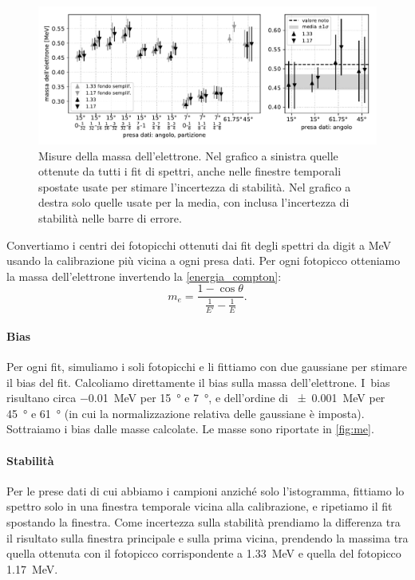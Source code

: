 \begin{figure}
	\hspace{-5em}\includegraphics[width=46em]{me}
	\caption{\label{fig:me}
	Misure della massa dell'elettrone.
	Nel grafico a sinistra quelle ottenute da tutti i fit di spettri,
	anche nelle finestre temporali spostate usate per stimare l'incertezza di stabilità.
	Nel grafico a destra solo quelle usate per la media,
	con inclusa l'incertezza di stabilità nelle barre di errore.}
\end{figure}

Convertiamo i centri dei fotopicchi ottenuti dai fit degli spettri
da digit a MeV usando la calibrazione più vicina a ogni presa dati.
Per ogni fotopicco otteniamo la massa dell'elettrone invertendo la \eqref{energia_compton}:
\begin{equation}
	\label{eq:me}
	m_e = \frac{1-\cos\theta}{\frac1{E'} - \frac1E}.
\end{equation}

\paragraph{Bias}

Per ogni fit, simuliamo i soli fotopicchi e li fittiamo con due gaussiane
per stimare il bias del fit. Calcoliamo direttamente il bias sulla massa dell'elettrone.
I~bias risultano circa \SI{-0.01}{MeV} per \SI{15}{\degree} e \SI{7}{\degree},
e dell'ordine di \SI{\pm0.001}{MeV} per \SI{45}{\degree} e \SI{61}{\degree}
(in cui la normalizzazione relativa delle gaussiane è imposta).
Sottraiamo i bias dalle masse calcolate.
Le masse sono riportate in \autoref{fig:me}.

\paragraph{Stabilità}

Per le prese dati di cui abbiamo i campioni anziché solo l'istogramma,
fittiamo lo spettro solo in una finestra temporale vicina alla calibrazione,
e ripetiamo il fit spostando la finestra.
Come incertezza sulla stabilità prendiamo la differenza
tra il risultato sulla finestra principale e sulla prima vicina,
prendendo la massima tra quella ottenuta con il fotopicco corrispondente a \SI{1.33}{MeV}
e quella del fotopicco \SI{1.17}{MeV}.

